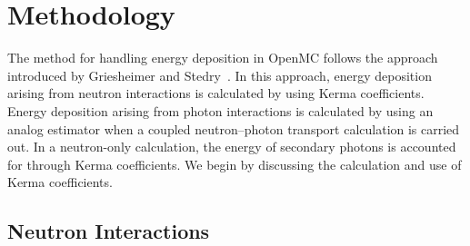 \documentclass{anstrans}
\begin{document}
\section{Methodology}

The method for handling energy deposition in OpenMC follows the approach
introduced by Griesheimer and Stedry~\cite{griesheimer2013mc}. In this approach,
energy deposition arising from neutron interactions is calculated by using Kerma
coefficients. Energy deposition arising from photon interactions is calculated
by using an analog estimator when a coupled neutron--photon transport calculation
is carried out. In a neutron-only calculation, the energy of secondary photons
is accounted for through Kerma coefficients. We begin by discussing the
calculation and use of Kerma coefficients.

\subsection{Neutron Interactions}
\end{document}
